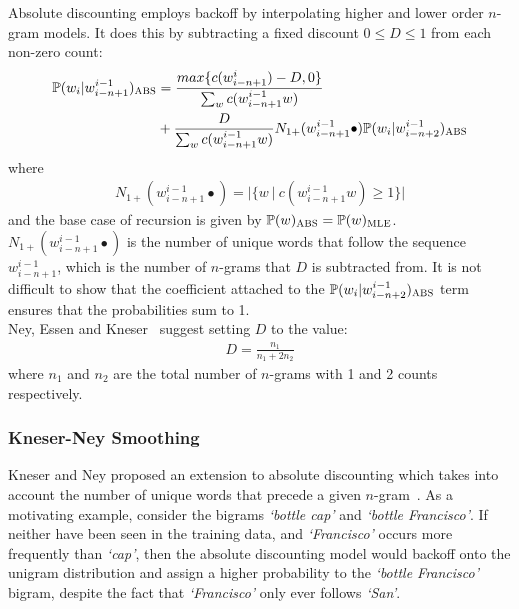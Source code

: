 \documentclass[a4paper, 12pt]{report}
\newcommand{\tit}[1]{\textit{#1}}
\begin{document}
Absolute discounting employs backoff by interpolating higher and lower order $n$-gram models. It does this by subtracting a fixed discount $0 \leq D \leq 1$ from each non-zero count:
\begin{equation}
\begin{aligned}
	\mathbb{P}(w_i | w_{i - n + 1}^{i - 1})_{\text{\scshape ABS}} &= \frac{max\{c(w_{i - n + 1}^{i}) - D, 0\}}{\sum_w c(w_{i - n + 1}^{i - 1}w)} \\
	&+ \frac{D}{\sum_w c(w_{i - n + 1}^{i - 1}w)}N_{1+}(w_{i - n + 1}^{i - 1}\bullet)\mathbb{P}(w_i | w_{i - n + 2}^{i - 1})_{\text{\scshape ABS}}
\end{aligned}
\end{equation}
where
\begin{gather} \label{eq:n1plus}
	N_{1+}(w_{i - n + 1}^{i - 1}\bullet) = |\{ w\ |\ c(w_{i - n + 1}^{i - 1}w) \geq 1 \}|
\end{gather}
and the base case of recursion is given by $\mathbb{P}(w)_{\text{\scshape ABS}} = \mathbb{P}(w)_{\text{\scshape MLE}}$. $N_{1+}(w_{i - n + 1}^{i - 1}\bullet)$ is the number of unique words that follow the sequence $w_{i - n + 1}^{i - 1}$, which is the number of $n$-grams that $D$ is subtracted from. It is not difficult to show that the coefficient attached to the $\mathbb{P}(w_i | w_{i - n + 2}^{i - 1})_{\text{\scshape ABS}}$ term ensures that the probabilities sum to 1. \\

Ney, Essen and Kneser~\cite{absolute_discounting:ney1994} suggest setting $D$ to the value:
\begin{gather} \label{eq:discount}
	D = \frac{n_1}{n_1 + 2n_2}
\end{gather}
where $n_1$ and $n_2$ are the total number of $n$-grams with 1 and 2 counts respectively.

\subsubsection{Kneser-Ney Smoothing}

Kneser and Ney proposed an extension to absolute discounting which takes into account the number of unique words that precede a given $n$-gram~\cite{kneser_ney_smoothing:kneser1995}. As a motivating example, consider the bigrams \tit{`bottle cap'} and \tit{`bottle Francisco'}. If neither have been seen in the training data, and \tit{`Francisco'} occurs more frequently than \tit{`cap'}, then the absolute discounting model would backoff onto the unigram distribution and assign a higher probability to the \tit{`bottle Francisco'} bigram, despite the fact that \tit{`Francisco'} only ever follows \tit{`San'}. \\
\end{document}
